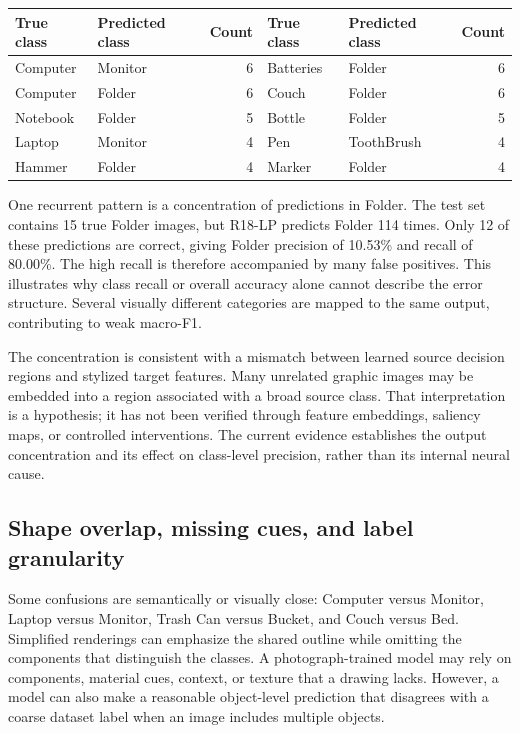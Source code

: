 \documentclass[10pt,a4paper]{article}
\begin{document}
\begin{center}\begin{minipage}{\linewidth}\centering
{}
\begin{tabular}{llr@{\qquad}llr}
\toprule
True class & Predicted class & Count & True class & Predicted class & Count\\
\midrule
Computer &Monitor&6 &Batteries &Folder&6\\
Computer &Folder&6 &Couch &Folder&6\\
Notebook &Folder&5 &Bottle &Folder&5\\
Laptop &Monitor&4 &Pen &ToothBrush&4\\
Hammer &Folder&4 &Marker &Folder&4\\
\bottomrule
\end{tabular}
\end{minipage}\end{center}

One recurrent pattern is a concentration of predictions in Folder. The test set contains 15 true Folder images, but R18-LP predicts Folder 114 times. Only 12 of these predictions are correct, giving Folder precision of 10.53\% and recall of 80.00\%. The high recall is therefore accompanied by many false positives. This illustrates why class recall or overall accuracy alone cannot describe the error structure. Several visually different categories are mapped to the same output, contributing to weak macro-F1.

The concentration is consistent with a mismatch between learned source decision regions and stylized target features. Many unrelated graphic images may be embedded into a region associated with a broad source class. That interpretation is a hypothesis; it has not been verified through feature embeddings, saliency maps, or controlled interventions. The current evidence establishes the output concentration and its effect on class-level precision, rather than its internal neural cause.

\subsection{Shape overlap, missing cues, and label granularity}
Some confusions are semantically or visually close: Computer versus Monitor, Laptop versus Monitor, Trash Can versus Bucket, and Couch versus Bed. Simplified renderings can emphasize the shared outline while omitting the components that distinguish the classes. A photograph-trained model may rely on components, material cues, context, or texture that a drawing lacks. However, a model can also make a reasonable object-level prediction that disagrees with a coarse dataset label when an image includes multiple objects.
\end{document}
